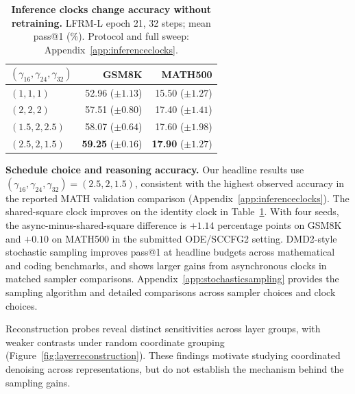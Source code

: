 \documentclass{article}
\newcommand{\rev}[1]{{\color{blue}#1}}
\begin{document}
\begin{table}
\vspace{-\baselineskip}
\centering\small
\setlength{\tabcolsep}{3pt}
\caption{\small\textbf{Inference clocks change accuracy without retraining.} LFRM-L epoch 21, 32 steps; mean pass@1 (\%). Protocol and full sweep: Appendix~\ref{app:inferenceclocks}.}
\label{tab:inferenceclocks}
\begin{tabular}{@{}lrr@{}}
\toprule
$(\gamma_{16},\gamma_{24},\gamma_{32})$ & GSM8K & MATH500 \\
\midrule
$(1,1,1)$ & 52.96 {\scriptsize($\pm 1.13$)} & 15.50 {\scriptsize($\pm 1.27$)} \\
$(2,2,2)$ & 57.51 {\scriptsize($\pm 0.80$)} & 17.40 {\scriptsize($\pm 1.41$)} \\
$(1.5,2,2.5)$ & 58.07 {\scriptsize($\pm 0.64$)} & 17.60 {\scriptsize($\pm 1.98$)} \\
$(2.5,2,1.5)$ & \textbf{59.25} {\scriptsize($\pm 0.16$)} & \textbf{17.90} {\scriptsize($\pm 1.27$)} \\
\bottomrule
\end{tabular}
\vspace{-\baselineskip}
\end{table}

\textbf{Schedule choice and reasoning accuracy.}
Our headline results use $(\gamma_{16},\gamma_{24},\gamma_{32})=(2.5,2,1.5)$, consistent with the highest observed accuracy in the reported MATH validation comparison (Appendix~\ref{app:inferenceclocks}). \rev{The shared-square clock improves on the identity clock in
Table~\ref{tab:inferenceclocks}. With four seeds, the async-minus-shared-square difference is $+1.14$ percentage points on GSM8K and $+0.10$ on MATH500 in the submitted ODE/SCCFG2
setting. DMD2-style stochastic sampling \citep{dmd2} improves pass@1 at headline budgets across mathematical and coding benchmarks, and shows larger gains from asynchronous clocks in matched sampler comparisons. Appendix~\ref{app:stochasticsampling} provides the sampling algorithm and detailed comparisons across sampler choices and clock choices.}

Reconstruction probes reveal distinct sensitivities across layer groups, with weaker contrasts under random coordinate grouping (Figure~\ref{fig:layerreconstruction}). These findings motivate studying coordinated denoising across representations, but do not establish the mechanism behind the sampling gains.
\end{document}
